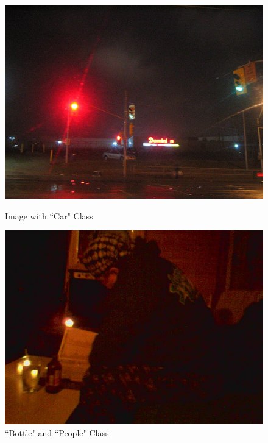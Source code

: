\documentclass{article} %
\begin{document}
\begin{figure}[htbp]
  \centering
  \begin{minipage}{.45\textwidth}
    \centering
    \includegraphics[width=\linewidth]{./figure+object/2015_02610.jpg}
    \caption{Image with ``Car" Class}
    \label{fig:car}
  \end{minipage}%
  \hfill
  \begin{minipage}{.45\textwidth}
    \centering
    \includegraphics[width=\linewidth]{./figure+object/2015_01439.jpg}
    \caption{``Bottle" and ``People" Class}
    \label{fig:bottle+people}
  \end{minipage}
\end{figure}
\end{document}
